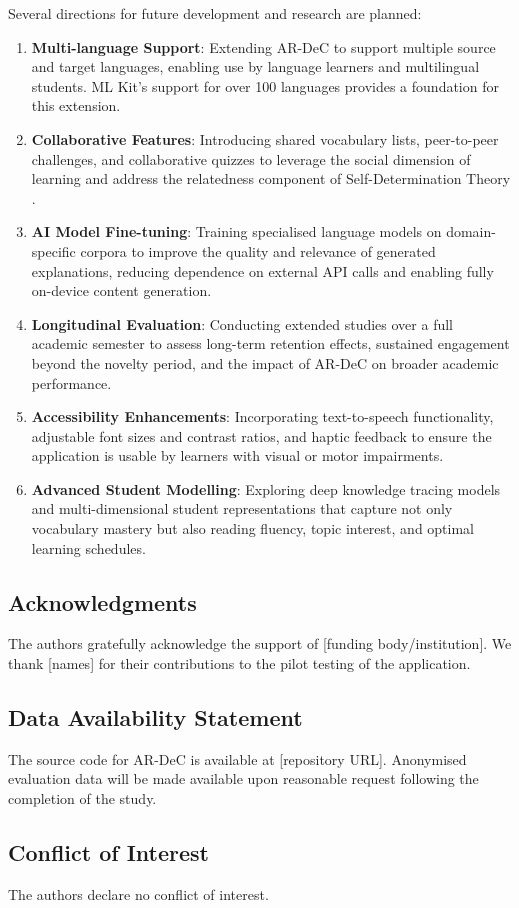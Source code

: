 Several directions for future development and research are planned:

\begin{enumerate}
    \item \textbf{Multi-language Support}: Extending AR-DeC to support multiple source and target languages, enabling use by language learners and multilingual students. ML Kit's support for over 100 languages provides a foundation for this extension.

    \item \textbf{Collaborative Features}: Introducing shared vocabulary lists, peer-to-peer challenges, and collaborative quizzes to leverage the social dimension of learning and address the relatedness component of Self-Determination Theory \cite{ryan2000}.

    \item \textbf{AI Model Fine-tuning}: Training specialised language models on domain-specific corpora to improve the quality and relevance of generated explanations, reducing dependence on external API calls and enabling fully on-device content generation.

    \item \textbf{Longitudinal Evaluation}: Conducting extended studies over a full academic semester to assess long-term retention effects, sustained engagement beyond the novelty period, and the impact of AR-DeC on broader academic performance.

    \item \textbf{Accessibility Enhancements}: Incorporating text-to-speech functionality, adjustable font sizes and contrast ratios, and haptic feedback to ensure the application is usable by learners with visual or motor impairments.

    \item \textbf{Advanced Student Modelling}: Exploring deep knowledge tracing models and multi-dimensional student representations that capture not only vocabulary mastery but also reading fluency, topic interest, and optimal learning schedules.
\end{enumerate}

\subsection*{Acknowledgments}

The authors gratefully acknowledge the support of [funding body/institution]. We thank [names] for their contributions to the pilot testing of the application.

\subsection*{Data Availability Statement}

The source code for AR-DeC is available at [repository URL]. Anonymised evaluation data will be made available upon reasonable request following the completion of the study.

\subsection*{Conflict of Interest}

The authors declare no conflict of interest.
